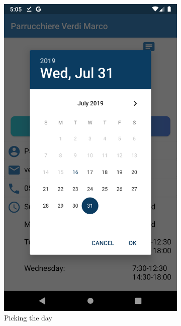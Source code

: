 \begin{figure}[h]
\centering
\begin{subfigure}{.5\textwidth}
  \centering
  \includegraphics[height=.4\textheight, keepaspectratio=true]{Img/Screens/Customer_Search_Selected_Day}
  \caption{Picking the day}
\end{subfigure}%
\begin{subfigure}{.5\textwidth}
  \centering

\end{subfigure}
\end{figure}
